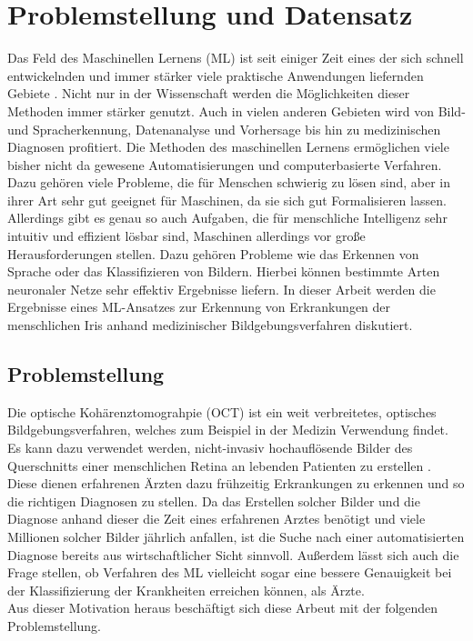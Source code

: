 \chapter{Problemstellung und Datensatz}

Das Feld des Maschinellen Lernens (ML) ist seit einiger Zeit eines der sich
schnell entwickelnden und immer stärker viele praktische Anwendungen liefernden
Gebiete \cite{goodfellow}. Nicht nur in der Wissenschaft werden die Möglichkeiten dieser Methoden
immer stärker genutzt. Auch in vielen anderen Gebieten wird von Bild- und
Spracherkennung, Datenanalyse und Vorhersage bis hin zu medizinischen Diagnosen
profitiert. Die Methoden des maschinellen Lernens ermöglichen viele bisher nicht
da gewesene Automatisierungen und computerbasierte Verfahren. \\
Dazu gehören viele Probleme, die für Menschen schwierig zu lösen sind, aber in
ihrer Art sehr gut geeignet für Maschinen, da sie sich gut Formalisieren lassen.
Allerdings gibt es genau so auch Aufgaben, die für menschliche Intelligenz sehr
intuitiv und effizient lösbar sind, Maschinen allerdings vor große
Herausforderungen stellen. Dazu gehören Probleme wie das Erkennen von Sprache
oder das Klassifizieren von Bildern.
Hierbei können bestimmte Arten neuronaler Netze sehr effektiv Ergebnisse
liefern.
In dieser Arbeit werden die Ergebnisse eines ML-Ansatzes zur Erkennung von
Erkrankungen der menschlichen Iris anhand medizinischer Bildgebungsverfahren
diskutiert.

\section{Problemstellung}

Die optische Kohärenztomograhpie (OCT) ist ein weit verbreitetes, optisches
Bildgebungsverfahren, welches zum Beispiel in der Medizin Verwendung
findet. Es kann dazu verwendet werden, nicht-invasiv hochauflösende
Bilder des Querschnitts einer menschlichen Retina an lebenden Patienten
zu erstellen \cite{paper}.\\
Diese dienen erfahrenen Ärzten dazu frühzeitig Erkrankungen zu erkennen
und so die richtigen Diagnosen zu stellen. Da das Erstellen solcher Bilder
und die Diagnose anhand dieser die Zeit eines erfahrenen Arztes benötigt
und viele Millionen solcher Bilder jährlich anfallen, ist die Suche nach
einer automatisierten Diagnose bereits aus wirtschaftlicher Sicht sinnvoll.
Außerdem lässt sich auch die Frage stellen, ob Verfahren des ML vielleicht
sogar eine bessere Genauigkeit bei der Klassifizierung der Krankheiten erreichen
können, als Ärzte.\\
Aus dieser Motivation heraus beschäftigt sich diese Arbeut mit der folgenden
Problemstellung.\\
\newline
\noindent{}\\

